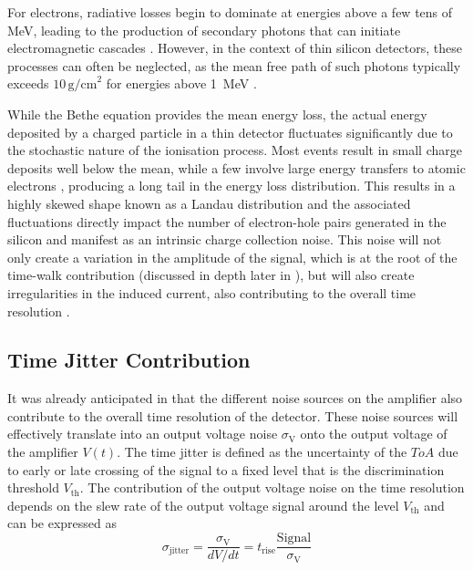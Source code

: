 		For electrons, radiative losses begin to dominate at energies above a few tens of MeV, leading to the production of secondary photons that can initiate electromagnetic cascades \cite{Paolozzi_thesis}. However, in the context of thin silicon detectors, these processes can often be neglected, as the mean free path of such photons typically exceeds $10\,\text{g/cm}^2$ for energies above \SI{1}{\mega\electronvolt} \cite{PDG}.

		While the Bethe equation provides the mean energy loss, the actual energy deposited by a charged particle in a thin detector fluctuates significantly due to the stochastic nature of the ionisation process. Most events result in small charge deposits well below the mean, while a few involve large energy transfers to atomic electrons , producing a long tail in the energy loss distribution. This results in a highly skewed shape known as a Landau distribution and the associated fluctuations directly impact the number of electron-hole pairs generated in the silicon and manifest as an intrinsic charge collection noise. This noise will not only create a variation in the amplitude of the signal, which is at the root of the time-walk contribution (discussed in depth later in ), but will also create irregularities in the induced current, also contributing to the overall time resolution \cite{timepix4}. 

		\subsection{Time Jitter Contribution}
		
		It was already anticipated in  that the different noise sources on the amplifier also contribute to the overall time resolution of the detector. These noise sources will effectively translate into an output voltage noise $\sigma_\text{V}$ onto the output voltage of the amplifier $V(t)$. The time jitter is defined as the uncertainty of the $ToA$ due to early or late crossing of the signal to a fixed level that is the discrimination threshold $V_{\text{th}}$. The contribution of the output voltage noise on the time resolution depends on the slew rate of the output voltage signal around the level $V_{\text{th}}$ and can be expressed as
		\begin{equation}
			\sigma_{\text{jitter}} = \frac{\sigma_{\text{V}}}{dV/dt} = t_{\text{rise}} \frac{\text{Signal}}{\sigma_{\text{V}}}
		\end{equation}  
		
